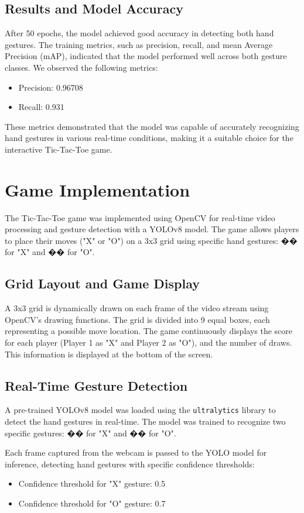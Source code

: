 \documentclass[a4paper,12pt]{article}
\begin{document}
\subsection{Results and Model Accuracy}
After 50 epochs, the model achieved good accuracy in detecting both hand gestures. The training metrics, such as precision, recall, and mean Average Precision (mAP), indicated that the model performed well across both gesture classes. We observed the following metrics:
\begin{itemize}
    \item Precision: 0.96708
    \item Recall: 0.931
\end{itemize}

These metrics demonstrated that the model was capable of accurately recognizing hand gestures in various real-time conditions, making it a suitable choice for the interactive Tic-Tac-Toe game.

\section{Game Implementation}
The Tic-Tac-Toe game was implemented using OpenCV for real-time video processing and gesture detection with a YOLOv8 model. The game allows players to place their moves ("X" or "O") on a 3x3 grid using specific hand gestures: �� for "X" and �� for "O".

\subsection{Grid Layout and Game Display}
A 3x3 grid is dynamically drawn on each frame of the video stream using OpenCV's drawing functions. The grid is divided into 9 equal boxes, each representing a possible move location. The game continuously displays the score for each player (Player 1 as "X" and Player 2 as "O"), and the number of draws. This information is displayed at the bottom of the screen.

\subsection{Real-Time Gesture Detection}
A pre-trained YOLOv8 model was loaded using the \texttt{ultralytics} library to detect the hand gestures in real-time. The model was trained to recognize two specific gestures: �� for "X" and �� for "O".

Each frame captured from the webcam is passed to the YOLO model for inference, detecting hand gestures with specific confidence thresholds:
\begin{itemize}
    \item Confidence threshold for "X" gesture: 0.5
    \item Confidence threshold for "O" gesture: 0.7
\end{itemize}
\end{document}
